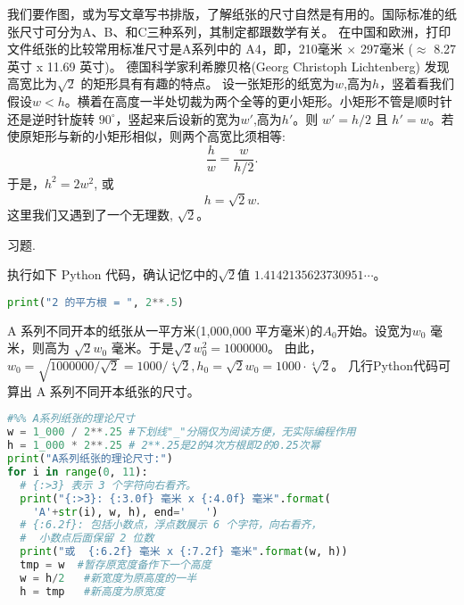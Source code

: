 \documentclass[main.tex]{subfiles}
\begin{document}
我们要作图，或为写文章写书排版，了解纸张的尺寸自然是有用的。国际标准的纸张尺寸可分为A、B、和C三种系列，其制定都跟数学有关。
在中国和欧洲，打印文件纸张的比较常用标准尺寸是A系列中的 A4，即，210毫米 × 297毫米 ($\approx$ 8.27 英寸 x 11.69 英寸)。
 德国科学家利希滕贝格(Georg Christoph Lichtenberg) 发现高宽比为$\sqrt{2}$
的矩形具有有趣的特点。
设一张矩形的纸宽为$w$,高为$h$，竖着看我们假设$w <h$。横着在高度一半处切裁为两个全等的更小矩形。小矩形不管是顺时针还是逆时针旋转 $90^\circ$，竖起来后设新的宽为$w'$,高为$h'$。则
$w' = h/2$ 且 $h' = w$。若使原矩形与新的小矩形相似，则两个高宽比须相等:
$$\frac{h}{w} = \frac{w}{h/2}.   $$
于是，$h^2= 2 w^2$, 或
 $$h= \sqrt{2} w.$$
这里我们又遇到了一个无理数, $\sqrt{2}$。
	
\begin{kaishu}习题.\end{kaishu} 执行如下 Python 代码，确认记忆中的$\sqrt{2}$值 $1.4142135623730951\cdots$。
\begin{spacing}{0.8}
	\begin{small}
	\begin{lstlisting}[language=Python]
print("2 的平方根 = ", 2**.5)
\end{lstlisting}
\end{small}
\end{spacing}

A 系列不同开本的纸张从一平方米(1,000,000 平方毫米)的$A_0$开始。设宽为$w_0$ 毫米，则高为
$\sqrt{2}w_0$ 毫米。于是$\sqrt{2}w_0^2 = 1000000$。
由此，
$w_0 = \sqrt{1000000/\sqrt{2}}=1000/\sqrt[4]{2}, 
h_0=\sqrt{2}w_0=1000\cdot\sqrt[4]{2}$。
几行Python代码可算出 A 系列不同开本纸张的尺寸。

\vspace{.4cm}
\begin{spacing}{0.8}
	\begin{small}
	\begin{lstlisting}[language=Python]
#%% A系列纸张的理论尺寸
w = 1_000 / 2**.25 #下划线"_"分隔仅为阅读方便，无实际编程作用
h = 1_000 * 2**.25 # 2**.25是2的4次方根即2的0.25次幂 
print("A系列纸张的理论尺寸:")
for i in range(0, 11):
  # {:>3} 表示 3 个字符向右看齐。
  print("{:>3}: {:3.0f} 毫米 x {:4.0f} 毫米".format(
    'A'+str(i), w, h), end='   ')
  # {:6.2f}: 包括小数点，浮点数展示 6 个字符，向右看齐，
  #  小数点后面保留 2 位数
  print("或  {:6.2f} 毫米 x {:7.2f} 毫米".format(w, h))
  tmp = w  #暂存原宽度备作下一个高度
  w = h/2   #新宽度为原高度的一半
  h = tmp   #新高度为原宽度
\end{lstlisting}
\end{small}
\end{spacing}
\vspace{.4cm}\label{a_paper_py}
\end{document}
